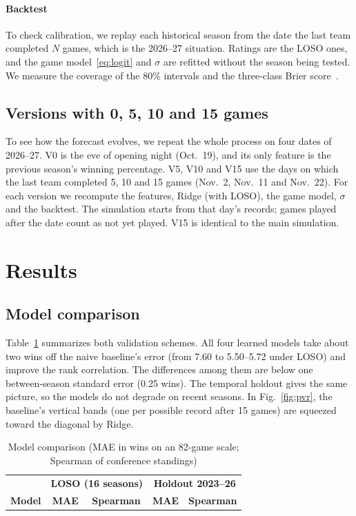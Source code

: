 \documentclass[conference]{IEEEtran}
\begin{document}
\paragraph{Backtest} To check calibration, we replay each historical season from the date the last team completed $N$ games, which is the 2026--27 situation. Ratings are the LOSO ones, and the game model~\eqref{eq:logit} and $\sigma$ are refitted without the season being tested. We measure the coverage of the 80\% intervals and the three-class Brier score~\cite{brier1950}.

\subsection{Versions with 0, 5, 10 and 15 games}
To see how the forecast evolves, we repeat the whole process on four dates of 2026--27. V0 is the eve of opening night (Oct.\ 19), and its only feature is the previous season's winning percentage. V5, V10 and V15 use the days on which the last team completed 5, 10 and 15 games (Nov.\ 2, Nov.\ 11 and Nov.\ 22). For each version we recompute the features, Ridge (with LOSO), the game model, $\sigma$ and the backtest. The simulation starts from that day's records; games played after the date count as not yet played. V15 is identical to the main simulation.

\section{Results}
\subsection{Model comparison}
Table~\ref{tab:models} summarizes both validation schemes. All four learned models take about two wins off the naive baseline's error (from 7.60 to 5.50--5.72 under LOSO) and improve the rank correlation. The differences among them are below one between-season standard error (0.25 wins). The temporal holdout gives the same picture, so the models do not degrade on recent seasons. In Fig.~\ref{fig:pvr}, the baseline's vertical bands (one per possible record after 15 games) are squeezed toward the diagonal by Ridge.

\begin{table}[t]
\caption{Model comparison (MAE in wins on an 82-game scale; Spearman of conference standings)}
\begin{center}
\begin{tabular}{lcccc}
\toprule
 & \multicolumn{2}{c}{\textbf{LOSO (16 seasons)}} & \multicolumn{2}{c}{\textbf{Holdout 2023--26}} \\
\textbf{Model} & \textbf{MAE} & \textbf{Spearman} & \textbf{MAE} & \textbf{Spearman} \\
\midrule

\bottomrule
\end{tabular}
\label{tab:models}
\end{center}
\end{table}
\end{document}
